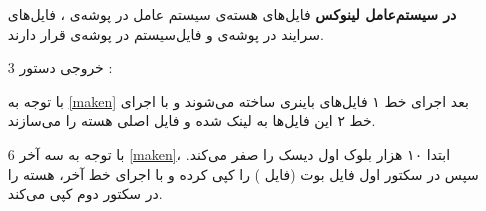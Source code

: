 \begin{itemize}
	\textbf{در سیستم‌عامل لینوکس} 
	فایل‌های هسته‌ی سیستم عامل در پوشه‌ی 
	، 
	فایل‌های سرایند در پوشه‌ی 
	و فایل‌سیستم در پوشه‌ی 
	قرار دارند.
	\item [3]
	خروجی دستور 
	: 
	\begin{latin}
		
	\end{latin}
	با توجه به 
	\ref{maken} 
	بعد اجرای خط ۱ فایل‌های باینری ساخته می‌شوند و با اجرای خط ۲ این فایل‌ها به لینک شده و فایل اصلی هسته را می‌سازند.
	\item [6]
	با توجه به سه آخر 
	\ref{maken}، 
	ابتدا ۱۰ هزار بلوک اول دیسک 
	را صفر می‌کند. سپس در سکتور اول فایل بوت (فایل 
	) 
	را کپی کرده و با اجرای خط آخر، هسته را در سکتور دوم کپی می‌کند.
\end{itemize}